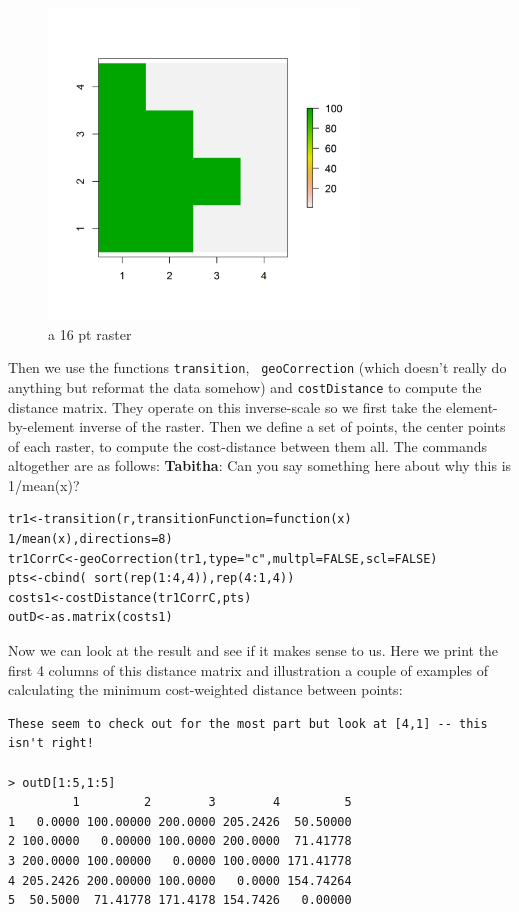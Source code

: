 \begin{figure}
\begin{center}
\includegraphics[height=3.25in,width=3.25in]{Ch10/figs/raster_2values}
\end{center}
\caption{a 16 pt raster}
\label{ecoldist.fig.raster}
\end{figure}

Then we use the functions \mbox{\tt transition}, \mbox{\tt
  geoCorrection} (which doesn't really do anything but reformat the
data somehow) and \mbox{\tt costDistance} to compute the distance
matrix. They operate on this inverse-scale so we first take the 
element-by-element inverse of the raster. Then we define a set of points,
the center points of each raster, to compute the cost-distance between
them all. The commands altogether are as follows:
{\bf Tabitha}: Can you say something here about why this is 1/mean(x)?
\begin{verbatim}
tr1<-transition(r,transitionFunction=function(x) 1/mean(x),directions=8)
tr1CorrC<-geoCorrection(tr1,type="c",multpl=FALSE,scl=FALSE)
pts<-cbind( sort(rep(1:4,4)),rep(4:1,4))
costs1<-costDistance(tr1CorrC,pts)
outD<-as.matrix(costs1)
\end{verbatim}
Now we can look at the result and see if it makes sense to us. Here we
print the first 4 columns of this distance matrix and illustration a
couple of examples of calculating the minimum cost-weighted distance
between points:

\begin{verbatim}
These seem to check out for the most part but look at [4,1] -- this isn't right!

> outD[1:5,1:5]
         1         2        3        4         5
1   0.0000 100.00000 200.0000 205.2426  50.50000
2 100.0000   0.00000 100.0000 200.0000  71.41778
3 200.0000 100.00000   0.0000 100.0000 171.41778
4 205.2426 200.00000 100.0000   0.0000 154.74264
5  50.5000  71.41778 171.4178 154.7426   0.00000

\end{verbatim}





